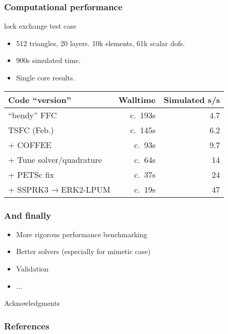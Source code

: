 \documentclass{beamer}
\begin{document}
\begin{frame}
  \frametitle{Computational performance}
  \begin{block}{\cite{Ilicak:2012} lock exchange test case}
    \begin{itemize}
    \item 512 triangles, 20 layers. 10k elements, 61k scalar dofs.
    \item 900s simulated time.
    \item Single core results.
    \end{itemize}
  \end{block}
{\small
  \begin{tabular}{lrr}
    Code ``version''               & Walltime & Simulated s/s \\
    \hline
    ``bendy'' FFC                  & c.~193s  & 4.7           \\
     TSFC (Feb.)                   & c.~145s  & 6.2           \\
    + COFFEE                       & c.~93s   & 9.7           \\
    + Tune solver/quadrature       & c.~64s   & 14            \\
    + PETSc fix                    & c.~37s   & 24            \\
    + SSPRK3$\rightarrow$ERK2-LPUM & c.~19s   & 47            \\
  \end{tabular}

}
\end{frame}

\begin{frame}
  \frametitle{And finally}
  \begin{itemize}
  \item More rigorous performance benchmarking
  \item Better solvers (especially for mimetic case)
  \item Validation
  \item ...
  \end{itemize}

  \begin{block}{Acknowledgments}
    \begin{center}
      \hfil{}
    \end{center}
    \begin{center}
      \hfil{}
      \hfil{}
    \end{center}
  \end{block}
\end{frame}
\appendix
\begin{frame}[t]
  \frametitle{References}
  \printbibliography[heading=none]
\end{frame}
\end{document}
